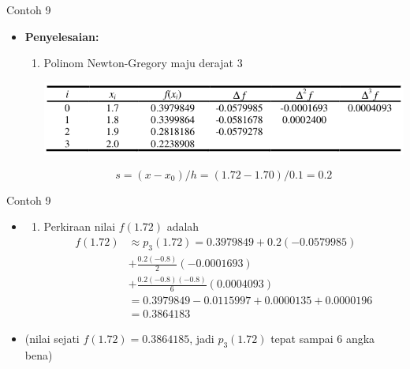 \documentclass[pdflatex,compress,mathserif]{beamer}
\begin{document}
\begin{frame}{Contoh 9}
	\begin{itemize}
		\item \textbf{Penyelesaian:} 
		\begin{enumerate}
			\item Polinom Newton-Gregory maju derajat 3
			\begin{center}
				\includegraphics[width=\linewidth]{img/img27}
			\end{center}
			\[ s = (x - x_0)/h = (1.72 - 1.70)/0.1 = 0.2 \]
		\end{enumerate}
	\end{itemize}
\end{frame}

\begin{frame}{Contoh 9}
	\begin{itemize}
		\item[]
		\begin{enumerate}
			\item[] Perkiraan nilai $ f(1.72) $ adalah
			\begin{align*}
			f(1.72) &\approx p_3(1.72) = 0.3979849 + 0.2(-0.0579985) \\
			&+ \frac{0.2(-0.8)}{2}(-0.0001693) \\
			&+ \frac{0.2(-0.8)(-0.8)}{6}(0.0004093) \\
			&= 0.3979849 - 0.0115997 + 0.0000135 + 0.0000196 \\
			&= 0.3864183
			\end{align*}
		\end{enumerate}
		\item[] (nilai sejati $ f(1.72) = 0.3864185 $, jadi $ p_3(1.72) $ tepat sampai 6 angka bena)
	\end{itemize}
\end{frame}
\end{document}
